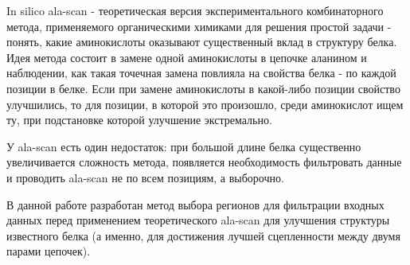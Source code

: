 \intro

In silico ala-scan - теоретическая версия экспериментального комбинаторного метода, применяемого органическими химиками для решения простой задачи - понять, какие аминокислоты оказывают существенный вклад в структуру белка. Идея метода состоит в замене одной аминокислоты в цепочке аланином и наблюдении, как такая точечная замена повлияла на свойства белка - по каждой позиции в белке. Если при замене аминокислоты в какой-либо позиции свойство улучшились, то для позиции, в которой это произошло, среди аминокислот ищем ту, при подстановке которой улучшение экстремально.

У ala-scan есть один недостаток: при большой длине белка существенно увеличивается сложность метода, появляется необходимость фильтровать данные и проводить ala-scan не по всем позициям, а выборочно.


В данной работе разработан метод выбора регионов для фильтрации входных данных перед применением теоретического ala-scan для улучшения структуры известного белка (а именно, для достижения лучшей сцепленности между двумя парами цепочек). 

